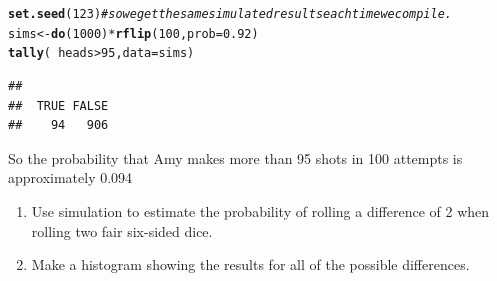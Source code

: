 \documentclass[twoside]{book}\usepackage[]{graphicx}\usepackage[]{xcolor}
\makeatletter
\newcommand{\hlnum}[1]{\textcolor[rgb]{0.686,0.059,0.569}{#1}}%
\newcommand{\hlcom}[1]{\textcolor[rgb]{0.678,0.584,0.686}{\textit{#1}}}%
\newcommand{\hlopt}[1]{\textcolor[rgb]{0,0,0}{#1}}%
\newcommand{\hlstd}[1]{\textcolor[rgb]{0.345,0.345,0.345}{#1}}%
\newcommand{\hlkwb}[1]{\textcolor[rgb]{0.69,0.353,0.396}{#1}}%
\newcommand{\hlkwc}[1]{\textcolor[rgb]{0.333,0.667,0.333}{#1}}%
\newcommand{\hlkwd}[1]{\textcolor[rgb]{0.737,0.353,0.396}{\textbf{#1}}}%
\newenvironment{kframe}{%
 \def\at@end@of@kframe{}%
 \ifinner\ifhmode%
  \def\at@end@of@kframe{\end{minipage}}%
  \begin{minipage}{\columnwidth}%
 \fi\fi%
 \def\FrameCommand##1{\hskip\@totalleftmargin \hskip-\fboxsep
 \colorbox{shadecolor}{##1}\hskip-\fboxsep
     \hskip-\linewidth \hskip-\@totalleftmargin \hskip\columnwidth}%
 \MakeFramed {\advance\hsize-\width
   \@totalleftmargin\z@ \linewidth\hsize
   \@setminipage}}%
 {\par\unskip\endMakeFramed%
 \at@end@of@kframe}
\newenvironment{knitrout}{}{} %
\makeatother
\begin{document}
\begin{solution}
\begin{knitrout}
\color{fgcolor}\begin{kframe}
\begin{alltt}
\hlkwd{set.seed}\hlstd{(}\hlnum{123}\hlstd{)}  \hlcom{# so we get the same simulated results each time we compile.}
\hlstd{sims} \hlkwb{<-} \hlkwd{do}\hlstd{(}\hlnum{1000}\hlstd{)} \hlopt{*} \hlkwd{rflip}\hlstd{(}\hlnum{100}\hlstd{,} \hlkwc{prob} \hlstd{=} \hlnum{0.92}\hlstd{)}
\hlkwd{tally}\hlstd{(}\hlopt{~}\hlstd{heads} \hlopt{>} \hlnum{95}\hlstd{,} \hlkwc{data} \hlstd{= sims)}
\end{alltt}
\begin{verbatim}
## 
##  TRUE FALSE 
##    94   906
\end{verbatim}
\end{kframe}
\end{knitrout}
So the probability that Amy makes more than 95 shots in 100 attempts is approximately
0.094
\end{solution}

\begin{problem}
	\begin{enumerate}
		\item
	Use simulation to estimate the probability of rolling a difference of 2 when rolling
	two fair six-sided dice.
\item
	Make a histogram showing the results for all of the possible differences.
	\end{enumerate}

\end{problem}
\end{document}
